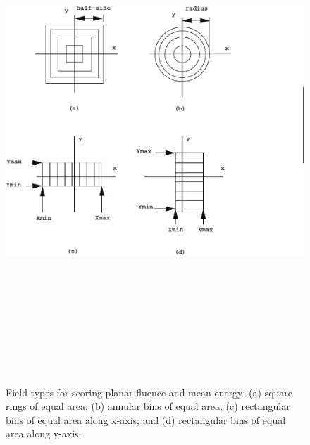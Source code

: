 \documentclass[12pt,twoside]{article}
\begin{document}
\begin{figure}[htbp]
\begin{center}
\vspace*{1cm}
\includegraphics[height=19cm]{figures/field-flu}
\caption[]
{Field types for scoring planar fluence and mean energy: (a) square rings
of equal area; (b) annular bins of equal area; (c) rectangular bins
of equal area along x-axis; and (d) rectangular bins of equal
area along y-axis. }
\label{fig-field-flu}
\end{center}
\end{figure}
\end{document}
